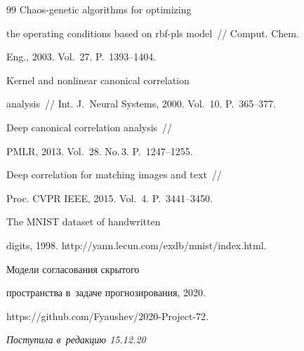 {{\begin{thebibliography}{99}
 Chaos-genetic algorithms for optimizing 

the operating conditions based on rbf-pls model~/\!\!/ Comput. Chem. 

Eng., 2003. Vol.~27. P.~1393--1404.




 Kernel and nonlinear canonical correlation 

analysis~/\!\!/ Int. J.~Neural Systems, 2000. Vol.~10. P.~365--377.




 Deep canonical correlation analysis~/\!\!/ 

PMLR, 2013. Vol.~28. No.\,3. P.~1247--1255.








 Deep correlation for matching images and text~/\!\!/ 

Proc. CVPR IEEE, 2015. Vol.~4. P.~3441--3450.




 The MNIST dataset of handwritten 

digits, 1998. {\sf http://yann.lecun.com/exdb/mnist/index.html}.




 Модели согласования скрытого 

пространства в~задаче прогнозирования,  2020. 

{\sf https://github.com/Fyaushev/2020-Project-72}.

     \end{thebibliography}

} }





\vspace*{-3pt}



\hfill{\small\textit{Поступила в~редакцию 15.12.20}}









